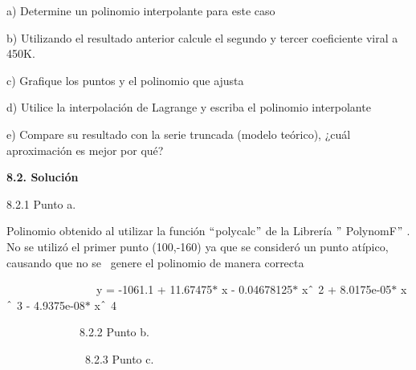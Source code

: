 \documentclass[12pt]{article}
\renewcommand{\_}{\kern-1.5pt\textunderscore\kern-1.5pt}
\begin{document}
a) Determine un polinomio interpolante para este caso \par

b) Utilizando el resultado anterior calcule el segundo y tercer coeficiente viral a 450K. \par

c) Graﬁque los puntos y el polinomio que ajusta \par

d) Utilice la interpolación de Lagrange y escriba el polinomio interpolante \par

e) Compare su resultado con la serie truncada (modelo teórico), ¿cuál aproximación es mejor por qué?\par


\vspace{\baselineskip}
\textbf{8.2. Solución}\par

 8.2.1 Punto a.\par

 Polinomio obtenido al utilizar la función $``$poly\_calc$"$  de la Librería $"$ PolynomF$"$ . No se  utilizó el primer punto (100,-160) ya que se consideró un punto atípico, causando que no se \  genere el polinomio de manera correcta\par

{\fontsize{11pt}{13.2pt}\selectfont \ \ \ \ \ \ \ \ \ \ \ \ \ \ \ \  y = -1061.1 + 11.67475$\ast$ x - 0.04678125$\ast$ x$ \string^ $ 2 + 8.0175e-05$\ast$ x$ \string^ $ 3 - 4.9375e-08$\ast$ x$ \string^ $ 4\par}\par


\vspace{\baselineskip}

\vspace{\baselineskip}

\vspace{\baselineskip}
{\fontsize{11pt}{13.2pt}\selectfont \ \ \ \ \  \ \ \ \ \ \ \ \   8.2.2 Punto b.\par}\par


\vspace{\baselineskip}
\par


\vspace{\baselineskip}
{\fontsize{11pt}{13.2pt}\selectfont \ \ \ \ \  \ \ \ \ \ \ \ \ \  8.2.3 Punto c.\par}\par
\end{document}
